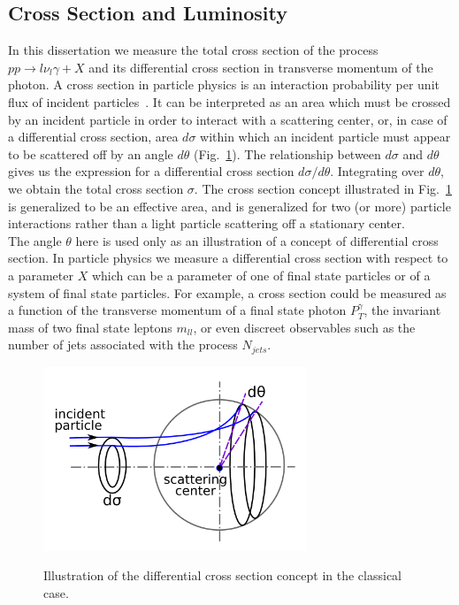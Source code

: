 \subsection{Cross Section and Luminosity}
\label{sec:WgAbout_LumiAndCS}

In this dissertation we measure the total cross section of the process $pp \rightarrow l \nu_l \gamma + X$ and its differential cross section in transverse momentum of the photon. A cross section in particle physics is an interaction probability per unit flux of incident particles~\cite{ref_fnal_LumiCS}. It can be interpreted as an area which must be crossed by an incident particle in order to interact with a scattering center, or, in case of a differential cross section, area $d\sigma$ within which an incident particle must appear to be scattered off by an angle $d\theta$ (Fig.~\ref{fig:CSclassical}). The relationship between $d\sigma$ and $d\theta$ gives us the expression for a differential cross section $d\sigma/d\theta$. Integrating over $d\theta$, we obtain the total cross section $\sigma$. The cross section concept illustrated in Fig.~\ref{fig:CSclassical} is generalized to be an effective area, and is generalized for two (or more) particle interactions rather than a light particle scattering off a stationary center. \\

The angle $\theta$ here is used only as an illustration of a concept of differential cross section. In particle physics we measure a differential cross section with respect to a parameter $X$ which can be a parameter of one of final state particles or of a system of final state particles. For example, a cross section could be measured as a function of the transverse momentum of a final state photon $P_T^\gamma$, the invariant mass of two final state leptons $m_{ll}$, or even discreet observables such as the number of jets associated with the process $N_{jets}$. \\

\begin{figure}[htb]
  \begin{center}
    {\includegraphics[width=0.70\textwidth]{../figs/WgAbout/CSclassical.png}}
    \caption{Illustration of the differential cross section concept in the classical case.}
    \label{fig:CSclassical}
  \end{center}
\end{figure}

